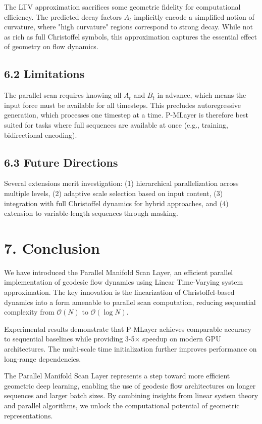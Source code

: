 \documentclass[12pt]{article}
\begin{document}
The LTV approximation sacrifices some geometric fidelity for computational efficiency. The predicted decay factors $A_t$ implicitly encode a simplified notion of curvature, where "high curvature" regions correspond to strong decay. While not as rich as full Christoffel symbols, this approximation captures the essential effect of geometry on flow dynamics.

\subsection{6.2 Limitations}

The parallel scan requires knowing all $A_t$ and $B_t$ in advance, which means the input force must be available for all timesteps. This precludes autoregressive generation, which processes one timestep at a time. P-MLayer is therefore best suited for tasks where full sequences are available at once (e.g., training, bidirectional encoding).

\subsection{6.3 Future Directions}

Several extensions merit investigation: (1) hierarchical parallelization across multiple levels, (2) adaptive scale selection based on input content, (3) integration with full Christoffel dynamics for hybrid approaches, and (4) extension to variable-length sequences through masking.

\section{7. Conclusion}

We have introduced the Parallel Manifold Scan Layer, an efficient parallel implementation of geodesic flow dynamics using Linear Time-Varying system approximation. The key innovation is the linearization of Christoffel-based dynamics into a form amenable to parallel scan computation, reducing sequential complexity from $\mathcal{O}(N)$ to $\mathcal{O}(\log N)$.

Experimental results demonstrate that P-MLayer achieves comparable accuracy to sequential baselines while providing 3-5× speedup on modern GPU architectures. The multi-scale time initialization further improves performance on long-range dependencies.

The Parallel Manifold Scan Layer represents a step toward more efficient geometric deep learning, enabling the use of geodesic flow architectures on longer sequences and larger batch sizes. By combining insights from linear system theory and parallel algorithms, we unlock the computational potential of geometric representations.
\end{document}
